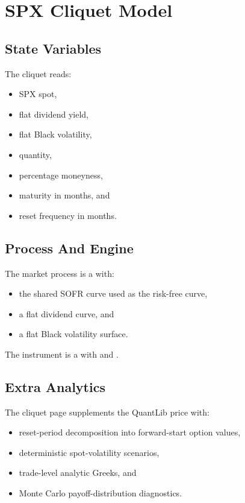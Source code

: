 \documentclass[11pt]{article}
\begin{document}
\section{SPX Cliquet Model}
\subsection{State Variables}
The cliquet reads:
\begin{itemize}[leftmargin=1.5em]
    \item SPX spot,
    \item flat dividend yield,
    \item flat Black volatility,
    \item quantity,
    \item percentage moneyness,
    \item maturity in months, and
    \item reset frequency in months.
\end{itemize}

\subsection{Process And Engine}
The market process is a  with:
\begin{itemize}[leftmargin=1.5em]
    \item the shared SOFR curve used as the risk-free curve,
    \item a flat dividend curve, and
    \item a flat Black volatility surface.
\end{itemize}
The instrument is a  with  and .

\subsection{Extra Analytics}
The cliquet page supplements the QuantLib price with:
\begin{itemize}[leftmargin=1.5em]
    \item reset-period decomposition into forward-start option values,
    \item deterministic spot-volatility scenarios,
    \item trade-level analytic Greeks, and
    \item Monte Carlo payoff-distribution diagnostics.
\end{itemize}
\end{document}
